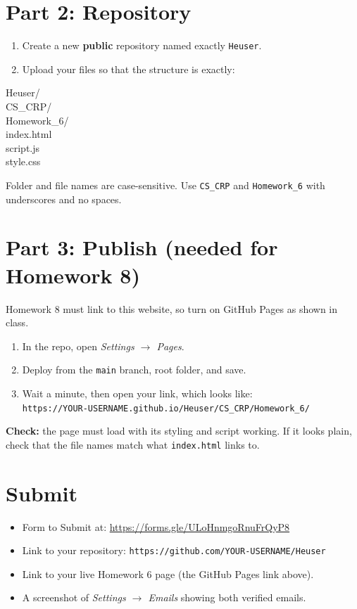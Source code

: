 \documentclass[11pt]{article}
\begin{document}
\section*{Part 2: Repository}
\begin{enumerate}[leftmargin=*,resume]
\item Create a new \textbf{public} repository named exactly \texttt{Heuser}.
\item Upload your files so that the structure is exactly:
\end{enumerate}
\begin{tcolorbox}[colback=white,colframe=navy!40,boxrule=0.5pt]
\ttfamily
Heuser/\\
\hspace*{1.5em}CS\_CRP/\\
\hspace*{3em}Homework\_6/\\
\hspace*{4.5em}index.html\\
\hspace*{4.5em}script.js\\
\hspace*{4.5em}style.css
\end{tcolorbox}
\begin{warn}
Folder and file names are case-sensitive. Use \texttt{CS\_CRP} and \texttt{Homework\_6} with underscores and no spaces.
\end{warn}

\section*{Part 3: Publish (needed for Homework 8)}
Homework 8 must link to this website, so turn on GitHub Pages as shown in class.
\begin{enumerate}[leftmargin=*,resume]
\item In the repo, open \textit{Settings $\rightarrow$ Pages}.
\item Deploy from the \texttt{main} branch, root folder, and save.
\item Wait a minute, then open your link, which looks like:\\
\texttt{https://YOUR-USERNAME.github.io/Heuser/CS\_CRP/Homework\_6/}
\end{enumerate}
\textbf{Check:} the page must load with its styling and script working. If it looks plain, check that the file names match what \texttt{index.html} links to.

\section*{Submit}
\begin{itemize}[leftmargin=*]
\item Form to Submit at: \url{https://forms.gle/ULoHnmgoRnuFrQyP8}
\item Link to your repository: \texttt{https://github.com/YOUR-USERNAME/Heuser}
\item Link to your live Homework 6 page (the GitHub Pages link above).
\item A screenshot of \textit{Settings $\rightarrow$ Emails} showing both verified emails.
\end{itemize}
\end{document}
